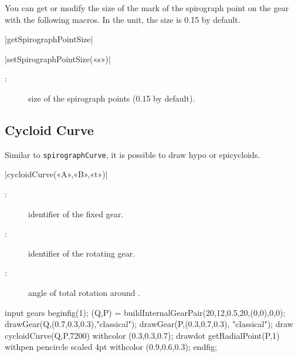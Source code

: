 \documentclass[english]{ltxdoc}
\begin{document}
You can get or modify the size of the mark of the spirograph point on the gear with the
following macros. In the \mpgears unit, the size is \num{0.15} by default.


\begin{colourband}
\commande|getSpirographPointSize|\smallskip{}
\end{colourband}


\begin{colourband}
\commande|setSpirographPointSize(«s»)|\smallskip{}
\begin{description}
\item[:]  size of the spirograph points (\num{0.15} by default).
\end{description}
\end{colourband}

\subsection{Cycloid Curve}

Similar to \lstinline+spirographCurve+, it is possible to draw hypo or
epicycloids.


\begin{colourband}
\commande|cycloidCurve(«A»,«B»,«t»)|\smallskip{}
\begin{description}
  \item[:]  identifier of the fixed gear.
  \item[:]   identifier of the rotating gear.
  \item[:]  angle of total rotation around .
\end{description}
\end{colourband}

\begin{ExempleMP}
input gears
beginfig(1);
  (Q,P) = buildInternalGearPair(20,12,0.5,20,(0,0),0,0);
  drawGear(Q,(0.7,0.3,0.3),"classical");
  drawGear(P,(0.3,0.7,0.3), "classical");
  draw cycloidCurve(Q,P,7200) withcolor (0.3,0.3,0.7);
  drawdot getRadialPoint(P,1) withpen pencircle scaled 4pt withcolor (0.9,0.6,0.3);
endfig;
\end{ExempleMP}
\end{document}

